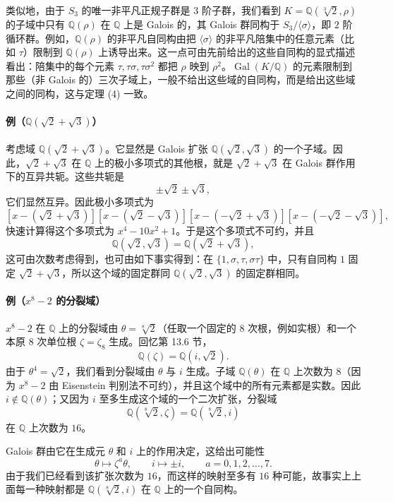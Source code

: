 类似地，由于 $S_3$ 的唯一非平凡正规子群是 $3$ 阶子群，我们看到 $K=\mathbb Q(\sqrt[3]{2},\rho)$ 的子域中只有 $\mathbb Q(\rho)$ 在 $\mathbb Q$ 上是 Galois 的，其 Galois 群同构于 $S_3/\langle\sigma\rangle$，即 $2$ 阶循环群。例如，$\mathbb Q(\rho)$ 的非平凡自同构由把 $\langle\sigma\rangle$ 的非平凡陪集中的任意元素（比如 $\tau$）限制到 $\mathbb Q(\rho)$ 上诱导出来。这一点可由先前给出的这些自同构的显式描述看出：陪集中的每个元素 $\tau,\tau\sigma,\tau\sigma^2$ 都把 $\rho$ 映到 $\rho^2$。$\operatorname{Gal}(K/\mathbb Q)$ 的元素限制到那些（非 Galois 的）三次子域上，一般不给出这些域的自同构，而是给出这些域之间的同构，这与定理 (4) 一致。

\paragraph{例（$\mathbb Q(\sqrt2+\sqrt3)$）}
考虑域 $\mathbb Q(\sqrt2+\sqrt3)$。它显然是 Galois 扩张 $\mathbb Q(\sqrt2,\sqrt3)$ 的一个子域。因此，$\sqrt2+\sqrt3$ 在 $\mathbb Q$ 上的极小多项式的其他根，就是 $\sqrt2+\sqrt3$ 在 Galois 群作用下的互异共轭。这些共轭是
\[
\pm\sqrt2\pm\sqrt3,
\]
它们显然互异。因此极小多项式为
\[
[x-(\sqrt2+\sqrt3)][x-(\sqrt2-\sqrt3)][x-(-\sqrt2+\sqrt3)][x-(-\sqrt2-\sqrt3)],
\]
快速计算得这个多项式为 $x^4-10x^2+1$。于是这个多项式不可约，并且
\[
\mathbb Q(\sqrt2,\sqrt3)=\mathbb Q(\sqrt2+\sqrt3),
\]
这可由次数考虑得到，也可由如下事实得到：在 $\{1,\sigma,\tau,\sigma\tau\}$ 中，只有自同构 $1$ 固定 $\sqrt2+\sqrt3$，所以这个域的固定群同 $\mathbb Q(\sqrt2,\sqrt3)$ 的固定群相同。

\paragraph{例（$x^8-2$ 的分裂域）}
$x^8-2$ 在 $\mathbb Q$ 上的分裂域由 $\theta=\sqrt[8]{2}$（任取一个固定的 $8$ 次根，例如实根）和一个本原 $8$ 次单位根 $\zeta=\zeta_8$ 生成。回忆第 13.6 节，
\[
\mathbb Q(\zeta)=\mathbb Q(i,\sqrt2).
\]
由于 $\theta^4=\sqrt2$，我们看到分裂域由 $\theta$ 与 $i$ 生成。子域 $\mathbb Q(\theta)$ 在 $\mathbb Q$ 上次数为 $8$（因为 $x^8-2$ 由 Eisenstein 判别法不可约），并且这个域中的所有元素都是实数。因此 $i\notin\mathbb Q(\theta)$；又因为 $i$ 至多生成这个域的一个二次扩张，分裂域
\[
\mathbb Q(\sqrt[8]{2},\zeta)=\mathbb Q(\sqrt[8]{2},i)
\]
在 $\mathbb Q$ 上次数为 $16$。

Galois 群由它在生成元 $\theta$ 和 $i$ 上的作用决定，这给出可能性
\[
\theta\longmapsto \zeta^a\theta,
\qquad
 i\longmapsto \pm i,
\qquad a=0,1,2,\ldots,7.
\]
由于我们已经看到该扩张次数为 $16$，而这样的映射至多有 $16$ 种可能，故事实上上面每一种映射都是 $\mathbb Q(\sqrt[8]{2},i)$ 在 $\mathbb Q$ 上的一个自同构。

